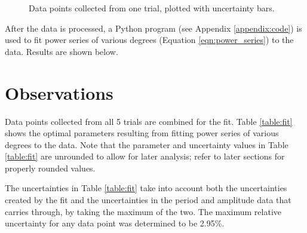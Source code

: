 \documentclass[aps,twocolumn,secnumarabic,nobalancelastpage,amsmath,amssymb,nofootinbib,floatfix,letterpaper]{revtex4}
\begin{document}
\begin{figure}[htb]
    \caption{Data points collected from one trial, plotted with uncertainty bars.}
    \label{fig:data1}
\end{figure}

After the data is processed, a Python program (see Appendix \ref{appendix:code}) is used to fit power series of various
degrees (Equation \ref{eqn:power_series}) to the data. Results are shown below.


\section{Observations}

Data points collected from all 5 trials are combined for the fit.
Table \ref{table:fit} shows the optimal parameters resulting from fitting power series of various degrees to the data.
Note that the parameter and uncertainty values in Table \ref{table:fit} are unrounded to allow for later analysis;
refer to later sections for properly rounded values.

The uncertainties in Table \ref{table:fit} take into account both the uncertainties created by the fit and the
uncertainties in the period and amplitude data that carries through, by taking the maximum of the two. The maximum
relative uncertainty for any data point was determined to be 2.95\%.
\end{document}
